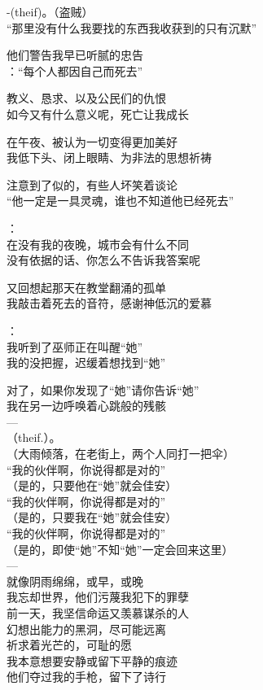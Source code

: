 \documentclass[
  10pt,
]{article}
\renewenvironment{quote}{\begin{leftbar}\small}{\end{leftbar}}
\begin{document}
\begin{quote}
-(theif)。（盗贼）\\
``那里没有什么我要找的东西我收获到的只有沉默''

他们警告我早已听腻的忠告\\
：``每个人都因自己而死去''

教义、恳求、以及公民们的仇恨\\
如今又有什么意义呢，死亡让我成长

在午夜、被认为一切变得更加美好\\
我低下头、闭上眼睛、为非法的思想祈祷

注意到了似的，有些人坏笑着谈论\\
``他一定是一具灵魂，谁也不知道他已经死去''

：\\
在没有我的夜晚，城市会有什么不同\\
没有依据的话、你怎么不告诉我答案呢

又回想起那天在教堂翻涌的孤单\\
我敲击着死去的音符，感谢神低沉的爱慕

：\\
我听到了巫师正在叫醒``她''\\
我的没把握，迟缓着想找到``她''

对了，如果你发现了``她''请你告诉``她''\\
我在另一边呼唤着心跳般的残骸\\
---\\
（theif.）。\\
（大雨倾落，在老街上，两个人同打一把伞）\\
``我的伙伴啊，你说得都是对的''\\
（是的，只要他在``她''就会佳安）\\
``我的伙伴啊，你说得都是对的''\\
（是的，只要我在``她''就会佳安）\\
``我的伙伴啊，你说得都是对的''\\
（是的，即使``她''不知``她''一定会回来这里）\\
---\\
就像阴雨绵绵，或早，或晚\\
我忘却世界，他们污蔑我犯下的罪孽\\
前一天，我坚信命运又羡慕谋杀的人\\
幻想出能力的黑洞，尽可能远离\\
祈求着光芒的，可耻的愿\\
我本意想要安静或留下平静的痕迹\\
他们夺过我的手枪，留下了诗行
\end{quote}
\end{document}
